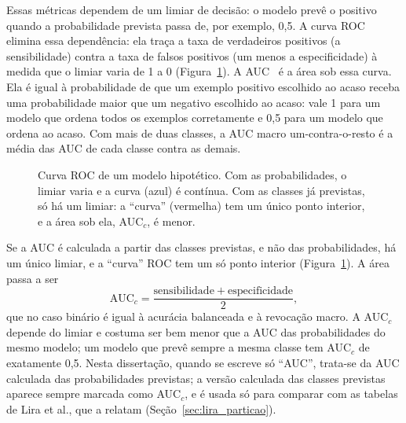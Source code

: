 Essas métricas dependem de um limiar de decisão: o modelo prevê o positivo quando a probabilidade prevista passa de, por exemplo, 0,5. A curva \gls{ROC} elimina essa dependência: ela traça a taxa de verdadeiros positivos (a sensibilidade) contra a taxa de falsos positivos (um menos a especificidade) à medida que o limiar varia de 1 a 0 (Figura~\ref{fig:roc_auc}). A \gls{AUC}~\cite{fawcett2006roc} é a área sob essa curva. Ela é igual à probabilidade de que um exemplo positivo escolhido ao acaso receba uma probabilidade maior que um negativo escolhido ao acaso: vale 1 para um modelo que ordena todos os exemplos corretamente e 0,5 para um modelo que ordena ao acaso. Com mais de duas classes, a AUC macro um-contra-o-resto é a média das AUC de cada classe contra as demais.

\begin{figure}[htpb]
\centering
{}
\caption{Curva ROC de um modelo hipotético. Com as probabilidades, o limiar varia e a curva (azul) é contínua. Com as classes já previstas, só há um limiar: a ``curva'' (vermelha) tem um único ponto interior, e a área sob ela, AUC$_c$, é menor.}
\label{fig:roc_auc}
\end{figure}

Se a AUC é calculada a partir das classes previstas, e não das probabilidades, há um único limiar, e a ``curva'' ROC tem um só ponto interior (Figura~\ref{fig:roc_auc}). A área passa a ser
\begin{equation}
\mathrm{AUC}_c = \frac{\mathrm{sensibilidade} + \mathrm{especificidade}}{2},
\end{equation}
que no caso binário é igual à acurácia balanceada e à revocação macro. A AUC$_c$ depende do limiar e costuma ser bem menor que a AUC das probabilidades do mesmo modelo; um modelo que prevê sempre a mesma classe tem AUC$_c$ de exatamente 0,5. Nesta dissertação, quando se escreve só ``AUC'', trata-se da AUC calculada das probabilidades previstas; a versão calculada das classes previstas aparece sempre marcada como AUC$_c$, e é usada só para comparar com as tabelas de Lira et al., que a relatam (Seção~\ref{sec:lira_particao}).

